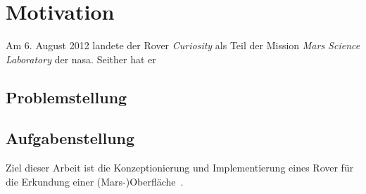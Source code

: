 \chapter{Motivation}
\label{chp:einleitung}

Am 6. August 2012 landete der Rover \textit{Curiosity} als Teil der Mission \textit{Mars Science Laboratory} der \acf{nasa}. %
Seither hat er 

\section{Problemstellung}
\label{sec:problem}



\section{Aufgabenstellung}
\label{sec:aufgabe}

Ziel dieser Arbeit ist die \glqq Konzeptionierung und Implementierung eines Rover für die Erkundung einer (Mars-)Oberfläche\grqq\ \cite{mueller2019}.